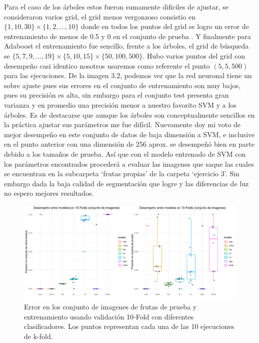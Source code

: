 \documentclass[paper=letter, fontsize=11pt]{scrartcl}
\numberwithin{equation}{section} %
\numberwithin{figure}{section} %
\numberwithin{table}{section} %
\begin{document}
Para el caso de los árboles estos fueron sumamente dificiles de ajustar, se consideraron varios grid, el grid menos vergonzoso consistio en $\{1,10,30\}\times\{1,2,...,10\}$ donde en todos los puntos del grid se logro un error de entrenamiento de menos de 0.5 y 0 en el conjunto de prueba . Y finalmente para Adaboost el entrenamiento fue sencillo, frente a los árboles, el grid de búsqueda se $\{5,7,9,..., 19\}\times \{5,10,15\} \times \{50,100,500\}$. Hubo varios puntos del grid con desempeño casi identico nosotros usaremos como referente el punto $(5,5,500)$ para las ejecuciones.
De la imagen 3.2, podemos ver que la red neuronal tiene un sobre ajuste pues sus errores en el conjunto de entrenamiento son muy bajos, pues su precisión es alta, sin embargo para el conjunto test presenta gran varianza y en promedio una precisión menor a nuestro favorito SVM y a los árboles. Es de destacarse que aunque los árboles son conceptualmente sencillos en la práctica ajustar sus parámetros me fue difícil. Nuevamente doy mi voto de mejor desempeño en este conjunto de datos de baja dimensión a SVM, e inclusive en el punto anterior con una dimensión de 256 aprox. se desempeñó bien en parte debido a los tamaños de prueba. Así que con el modelo entrenado de SVM con los parámetros encontrados procederá a evaluar las imagenes que saque las cuales se encuentran en la subcarpeta  ‘frutas propias’ de la carpeta ‘ejercicio 3’. Sin embargo dada la baja calidad de segmentación que logre y las diferencias de luz no espero mejores resultados. 


\begin{figure}[H]
  \begin{center}
    \includegraphics[scale =.5]{imagenesmodelos.png}
    \caption{Error en los conjunto de imagenes de frutas de prueba y entrenamiento usando validación 10-Fold con diferentes clasificadores. Los puntos representan cada una de las 10 ejecuciones de k-fold.}
    \label{figura3_2}
  \end{center}
\end{figure}
\end{document}
